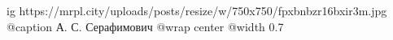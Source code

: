  
 
 
 
 

\ifcmt
  ig https://mrpl.city/uploads/posts/resize/w/750x750/fpxbnbzr16bxir3m.jpg
	@caption А. С. Серафимович
  @wrap center
  @width 0.7
\fi
